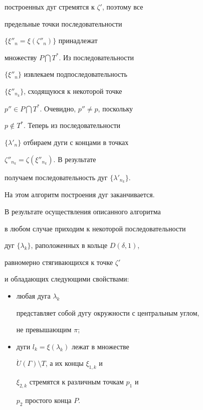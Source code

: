 \begin{pf}
построенных дуг стремятся к $\zeta'$, поэтому все


предельные точки последовательности 


$\{\xi''_{n}=\xi(\zeta''_{n})\}$ принадлежат


множеству $P\bigcap T^{*}$. Из последовательности 


$\{\xi''_{n}\}$ извлекаем подпоследовательность 


$\{\xi''_{n_{k}}\}$, сходящуюся к некоторой точке


$p''\in P\bigcap T^{*}$. Очевидно, $p''\not= p$, поскольку


$p\notin T^{*}$. Теперь из последовательности 


$\{\lambda'_{n}\}$ отбираем дуги с концами в точках


$\zeta''_{n_{k}}=\zeta(\xi''_{n_{k}})$. В результате


получаем последовательность дуг $\{\lambda'_{n_{k}}\}$.


На этом алгоритм построения дуг заканчивается. 





В результате осуществления описанного алгоритма


в любом случае приходим к некоторой последовательности


дуг $\{\lambda_{k}\}$, раположенных в кольце $D(\delta,1)$,


равномерно стягивающихся к точке $\zeta'$


и обладающих следующими свойствами: 


\begin{itemize}


\item[a)] любая дуга $\lambda_{k}$ 


представляет собой дугу окружности с центральным углом, 


не превышающим $\pi$; 


\item[b)] дуги $l_{k}=\xi(\lambda_{k})$ лежат в множестве


$\Dot{U}(\Gamma)\setminus T$, а их концы $\xi_{1,k}$ и 


$\xi_{2,k}$ стремятся к различным точкам $p_{1}$ и 


$p_{2}$ простого конца $P$. 


\end{itemize}


\setcounter{footnote}{0}






\end{pf}
